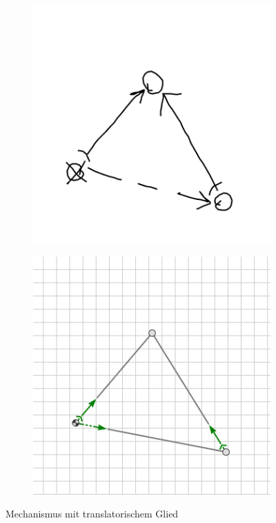\begin{figure}[H]
    \centering
    \begin{subfigure}[b]{0.3\textwidth}
        \includegraphics[width=\textwidth]{images/pump_sketch.png}
        \caption{}
        \label{fig:pump_sketch}
    \end{subfigure}
    \begin{subfigure}[b]{0.3\textwidth}
        \includegraphics[width=\textwidth]{images/pump_prediction.png}
        \caption{}
        \label{fig:pump_prediction}
    \end{subfigure}
    \label{fig:pump_example}
    \caption{Mechanismus mit translatorischem Glied}
\end{figure}